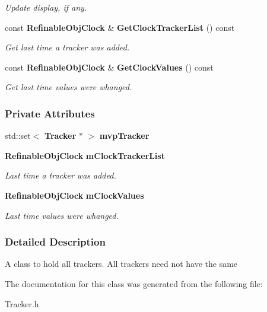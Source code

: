 \begin{DoxyCompactItemize}
\begin{DoxyCompactList}\small\item\em Update display, if any. \item\end{DoxyCompactList}\item 
const {\bf RefinableObjClock} \& {\bf GetClockTrackerList} () const \label{a00040_a1ed9dc3f6f4e7fae6ce7da58f0a78fc1}

\begin{DoxyCompactList}\small\item\em Get last time a tracker was added. \item\end{DoxyCompactList}\item 
const {\bf RefinableObjClock} \& {\bf GetClockValues} () const \label{a00040_aa7da65b819f1ba0ec180ee5374eddcf2}

\begin{DoxyCompactList}\small\item\em Get last time values were whanged. \item\end{DoxyCompactList}\end{DoxyCompactItemize}
\subsubsection*{Private Attributes}
\begin{DoxyCompactItemize}
\item 
std::set$<$ {\bf Tracker} $\ast$ $>$ {\bfseries mvpTracker}\label{a00040_a888837e8412f072986a6d3307d1c95a9}

\item 
{\bf RefinableObjClock} {\bf mClockTrackerList}\label{a00040_a06750efaa9482ebb71a043744fb9c6a6}

\begin{DoxyCompactList}\small\item\em Last time a tracker was added. \item\end{DoxyCompactList}\item 
{\bf RefinableObjClock} {\bf mClockValues}\label{a00040_a83a5fd9e84a64342b2c10e57e3c85df9}

\begin{DoxyCompactList}\small\item\em Last time values were whanged. \item\end{DoxyCompactList}\end{DoxyCompactItemize}


\subsubsection{Detailed Description}
A class to hold all trackers. All trackers need not have the same 

The documentation for this class was generated from the following file:\begin{DoxyCompactItemize}
\item 
Tracker.h\end{DoxyCompactItemize}
